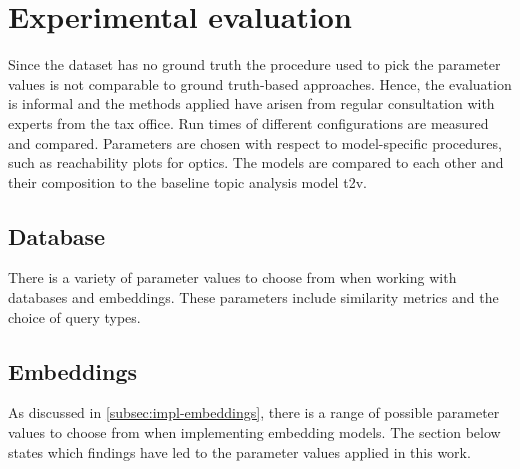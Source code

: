 \chapter{Experimental evaluation}\label{ch:evaluation}

Since the dataset has no ground truth the procedure used to pick the parameter values is not comparable to ground truth-based approaches.
Hence, the evaluation is informal and the methods applied have arisen from regular consultation with experts from the tax office.
Run times of different configurations are measured and compared.
Parameters are chosen with respect to model-specific procedures, such as reachability plots for \ac{optics}.
The models are compared to each other and their composition to the baseline topic analysis model \ac{t2v}.


 \section{Database}\label{sec:eval-db}
There is a variety of parameter values to choose from when working with databases and embeddings.
These parameters include similarity metrics and the choice of query types.

 

 

 
 
\section{Embeddings}\label{sec:eval-embeddings}
As discussed in \autoref{subsec:impl-embeddings}, there is a range of possible parameter values to choose from when implementing embedding models.
The section below states which findings have led to the parameter values applied in this work.















